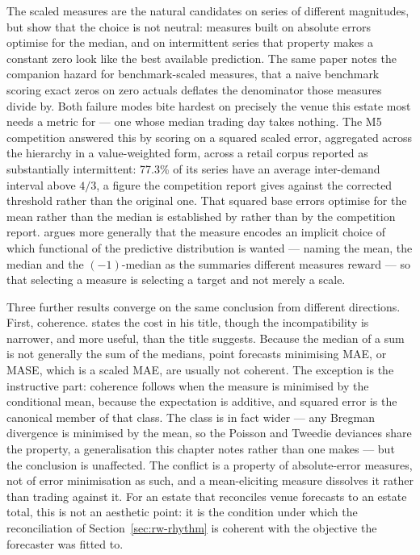 The scaled measures are the natural candidates on series of different
magnitudes, but \citet{hewamalage_forecast_2023} show that the choice is not
neutral: measures built on absolute errors optimise for the median, and on
intermittent series that property makes a constant zero look like the best
available prediction. The same paper notes the companion hazard for
benchmark-scaled measures, that a naive benchmark scoring exact zeros on zero
actuals deflates the denominator those measures divide by. Both failure modes
bite hardest on precisely the venue this estate most needs a metric for --- one
whose median trading day takes nothing. The M5 competition
\citep{makridakis_m5_2022} answered this by scoring on a squared scaled error,
aggregated across the hierarchy in a value-weighted form, across a retail
corpus reported as substantially intermittent: 77.3\% of its series have an
average inter-demand interval above $4/3$, a figure the competition report
gives against the corrected \citet{kostenko_note_2006} threshold rather than
the original one. That squared base errors optimise for the mean rather than
the median is established by \citet{hewamalage_forecast_2023} rather than by
the competition report. \citet{kolassa_why_2020} argues more generally that the
measure encodes an implicit choice of which functional of the predictive
distribution is wanted --- naming the mean, the median and the $(-1)$-median as
the summaries different measures reward --- so that selecting a measure is
selecting a target and not merely a scale.

Three further results converge on the same conclusion from different
directions. First, coherence. \citet{kolassa_we_2023} states the cost in his
title, though the incompatibility is narrower, and more useful, than the title
suggests. Because the median of a sum is not generally the sum of the medians,
point forecasts minimising MAE, or MASE, which is a scaled MAE, are usually not
coherent. The exception is the instructive part: coherence follows when the
measure is minimised by the conditional mean, because the expectation is
additive, and squared error is the canonical member of that class. The class is
in fact wider --- any Bregman divergence is minimised by the mean, so the
Poisson and Tweedie deviances share the property, a generalisation this chapter
notes rather than one \citeauthor{kolassa_we_2023} makes --- but the conclusion
is unaffected. The conflict is a property of absolute-error measures, not of
error minimisation as such, and a mean-eliciting measure dissolves it rather
than trading against it. For an estate that reconciles venue forecasts to an
estate total, this is not an aesthetic point: it is the condition under which
the reconciliation of Section~\ref{sec:rw-rhythm} is coherent with the
objective the forecaster was fitted to.

